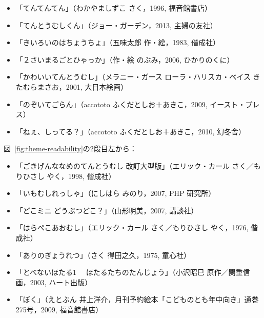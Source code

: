 \documentclass[japanese]{jnlp_1.4}
\begin{document}
\begin{itemize}
\small
\item 「てんてんてん」（わかやましずこ さく，1996, 福音館書店）

\item 「てんとうむしくん」（ジョー・ガーデン，2013, 主婦の友社）

\item 「きいろいのはちょうちょ」（五味太郎 作・絵，1983, 偕成社）

\item 「２さいまるごとひゃっか」（作・絵 のぶみ，2006, ひかりのくに）

\item 「かわいいてんとうむし」（メラニー・ガース ローラ・ハリスカ・ベイス きたむらまさお，2001, 大日本絵画）

\item 「のぞいてごらん」（accototo ふくだとしお＋あきこ，2009, イースト・プレス）

\item 「ねぇ、しってる？」（accototo ふくだとしお＋あきこ，2010, 幻冬舎）

\end{itemize}
\normalsize
 
図~\ref{fig:theme-readability}の2段目左から：

\begin{itemize}
\small
\item 「ごきげんななめのてんとうむし 改訂大型版」（エリック・カール さく／もりひさし やく，1998, 偕成社）

\item 「いもむしれっしゃ」（にしはら みのり，2007, PHP 研究所）

\item 「どこミニ どうぶつどこ？」（山形明美，2007, 講談社）

\item 「はらぺこあおむし」（エリック・カール さく／もりひさし やく，1976, 偕成社）

\item 「ありのぎょうれつ」（さく 得田之久，1975, 童心社）

\item 「とべないほたる1　 ほたるたちのたんじょう」（小沢昭巳 原作／関重信 画，2003, ハート出版）

\item 「ぼく」（えとぶん 井上洋介，月刊予約絵本「こどものとも年中向き」通巻275号，2009, 福音館書店）

\end{itemize}
\end{document}
